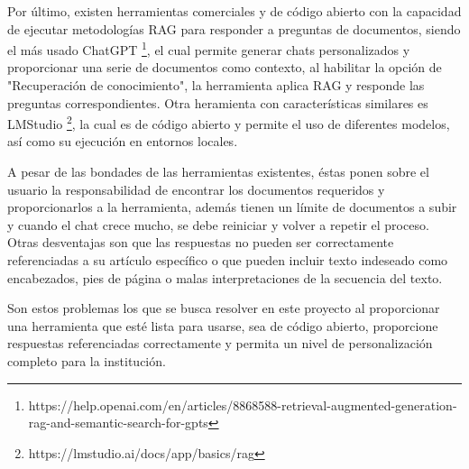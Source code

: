 Por último, existen herramientas comerciales y de código abierto con la
capacidad de ejecutar metodologías RAG para responder a preguntas de documentos,
siendo el más usado ChatGPT
\footnote{https://help.openai.com/en/articles/8868588-retrieval-augmented-generation-rag-and-semantic-search-for-gpts},
el cual permite generar chats personalizados
y proporcionar una serie de documentos como contexto, al habilitar la opción
de "Recuperación de conocimiento", la herramienta aplica RAG y responde
las preguntas correspondientes. Otra heramienta con características
similares es LMStudio
\footnote{https://lmstudio.ai/docs/app/basics/rag},
la cual es de código abierto y permite el uso de
diferentes modelos, así como su ejecución en entornos locales.

A pesar de las bondades de las herramientas existentes, éstas
ponen sobre el usuario la responsabilidad de encontrar los documentos
requeridos y proporcionarlos a la herramienta, además tienen un límite de
documentos a subir y cuando el chat crece mucho, se debe reiniciar y volver
a repetir el proceso. Otras desventajas son que las respuestas no pueden ser
correctamente referenciadas a su artículo específico o que pueden incluir texto
indeseado como encabezados, pies de página o malas interpretaciones de la
secuencia del texto.

Son estos problemas los que se busca resolver en este proyecto al proporcionar
una herramienta que esté lista para usarse, sea de código abierto, proporcione
respuestas referenciadas correctamente y permita un nivel de personalización
completo para la institución.
